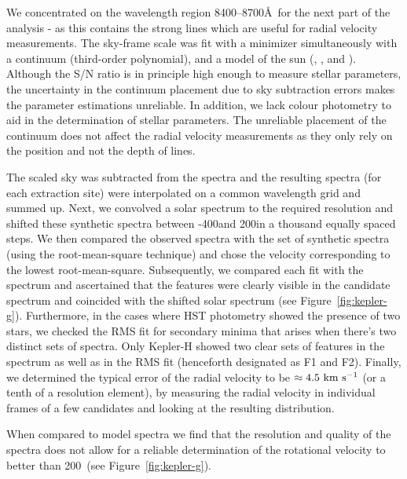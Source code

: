 \documentclass[preprint2]{aastex}
\begin{document}
We concentrated on the wavelength region 8400--8700\AA\ for the next part of the analysis - as this contains the strong  lines which are useful for radial velocity measurements. The sky-frame scale was fit with a minimizer \citep{powell1964efficient} simultaneously with a continuum (third-order polynomial), and a model of the sun (, , and ). Although the S/N ratio is in principle high enough to measure stellar parameters, the uncertainty in the continuum placement due to sky
subtraction errors makes the parameter estimations unreliable. In addition, we lack colour photometry to aid in the determination of stellar parameters. The unreliable placement of the continuum does not affect the radial velocity measurements as they only rely on the position and not the depth of lines.

The scaled sky was subtracted from the spectra and the resulting spectra (for each extraction site) were interpolated on a common wavelength grid and summed up. Next, we convolved a solar spectrum to the required resolution and shifted these synthetic spectra between -400\kms and 200\kms in a thousand equally spaced steps. We then compared the observed spectra with the set of synthetic spectra (using the root-mean-square technique) and chose the velocity corresponding to the lowest root-mean-square. Subsequently, we compared each fit with the spectrum and ascertained that the  features were clearly visible in the candidate spectrum and coincided with the shifted solar spectrum (see Figure~\ref{fig:kepler-g}). Furthermore, in the cases where HST photometry showed the presence of two stars, we checked the RMS fit for secondary minima that arises when there's two distinct sets of spectra. Only Kepler-H showed two clear sets of  features in the spectrum as well as in the RMS fit (henceforth designated as F1 and F2). Finally, we determined the typical error of the radial velocity to be $\approx4.5~\textrm{km}~\textrm{s}^{-1}$  (or a tenth of a resolution element), by measuring the radial velocity in individual frames of a few candidates and looking at the resulting distribution. 

When compared to model spectra we find that the resolution and quality of the spectra does not allow for a reliable determination of the rotational velocity to better than 200~\kms (see Figure~\ref{fig:kepler-g}). 




\end{document}
